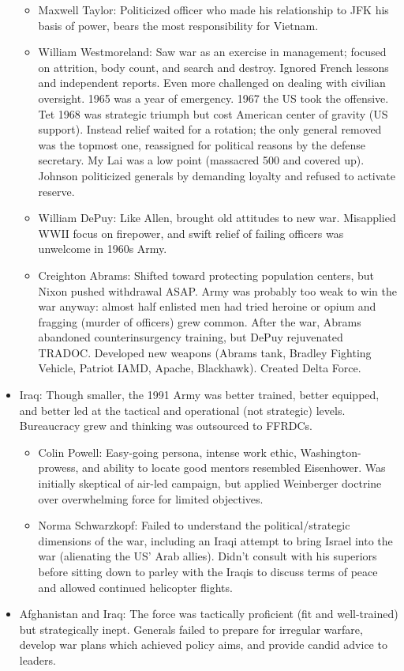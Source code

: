 \documentclass[
]{article}
\begin{document}
\begin{itemize}
  \begin{itemize}
  \item
    Maxwell Taylor: Politicized officer who made his relationship to JFK
    his basis of power, bears the most responsibility for Vietnam.
  \item
    William Westmoreland: Saw war as an exercise in management; focused
    on attrition, body count, and search and destroy. Ignored French
    lessons and independent reports. Even more challenged on dealing
    with civilian oversight. 1965 was a year of emergency. 1967 the US
    took the offensive. Tet 1968 was strategic triumph but cost American
    center of gravity (US support). Instead relief waited for a
    rotation; the only general removed was the topmost one, reassigned
    for political reasons by the defense secretary. My Lai was a low
    point (massacred 500 and covered up). Johnson politicized generals
    by demanding loyalty and refused to activate reserve.
  \item
    William DePuy: Like Allen, brought old attitudes to new war.
    Misapplied WWII focus on firepower, and swift relief of failing
    officers was unwelcome in 1960s Army.
  \item
    Creighton Abrams: Shifted toward protecting population centers, but
    Nixon pushed withdrawal ASAP. Army was probably too weak to win the
    war anyway: almost half enlisted men had tried heroine or opium and
    fragging (murder of officers) grew common. After the war, Abrams
    abandoned counterinsurgency training, but DePuy rejuvenated TRADOC.
    Developed new weapons (Abrams tank, Bradley Fighting Vehicle,
    Patriot IAMD, Apache, Blackhawk). Created Delta Force.
  \end{itemize}
\item
  Iraq: Though smaller, the 1991 Army was better trained, better
  equipped, and better led at the tactical and operational (not
  strategic) levels. Bureaucracy grew and thinking was outsourced to
  FFRDCs.

  \begin{itemize}
  \item
    Colin Powell: Easy-going persona, intense work ethic,
    Washington-prowess, and ability to locate good mentors resembled
    Eisenhower. Was initially skeptical of air-led campaign, but applied
    Weinberger doctrine over overwhelming force for limited objectives.
  \item
    Norma Schwarzkopf: Failed to understand the political/strategic
    dimensions of the war, including an Iraqi attempt to bring Israel
    into the war (alienating the US' Arab allies). Didn't consult with
    his superiors before sitting down to parley with the Iraqis to
    discuss terms of peace and allowed continued helicopter flights.
  \end{itemize}
\item
  Afghanistan and Iraq: The force was tactically proficient (fit and
  well-trained) but strategically inept. Generals failed to prepare for
  irregular warfare, develop war plans which achieved policy aims, and
  provide candid advice to leaders.


\end{itemize}
\end{document}
